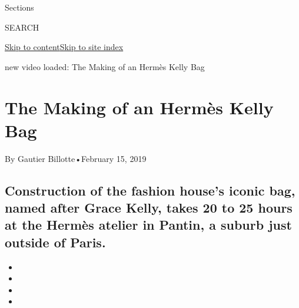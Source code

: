 Sections

SEARCH

\protect\hyperlink{site-content}{Skip to
content}\protect\hyperlink{site-index}{Skip to site index}

new video loaded: The Making of an Hermès Kelly Bag

\hypertarget{the-making-of-an-hermuxe8s-kelly-bag}{%
\section{The Making of an Hermès Kelly
Bag}\label{the-making-of-an-hermuxe8s-kelly-bag}}

By Gautier Billotte•February 15, 2019

\hypertarget{construction-of-the-fashion-houses-iconic-bag-named-after-grace-kelly-takes-20-to-25-hours-at-the-hermuxe8s-atelier-in-pantin-a-suburb-just-outside-of-paris}{%
\subsection{Construction of the fashion house's iconic bag, named after
Grace Kelly, takes 20 to 25 hours at the Hermès atelier in Pantin, a
suburb just outside of
Paris.}\label{construction-of-the-fashion-houses-iconic-bag-named-after-grace-kelly-takes-20-to-25-hours-at-the-hermuxe8s-atelier-in-pantin-a-suburb-just-outside-of-paris}}

\begin{itemize}
\item
\item
\item
\item
\end{itemize}

